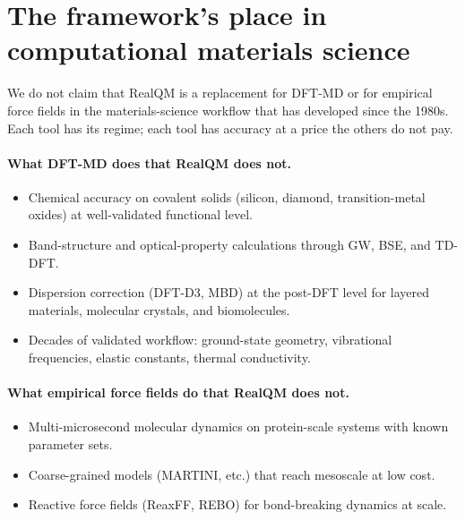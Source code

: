 \section{The framework's place in computational materials science}\label{sec:material-place}

We do not claim that RealQM is a replacement for DFT-MD or for empirical force fields in the materials-science workflow that has developed since the 1980s. Each tool has its regime; each tool has accuracy at a price the others do not pay.

\paragraph{What DFT-MD does that RealQM does not.}
\begin{itemize}
\item Chemical accuracy on covalent solids (silicon, diamond, transition-metal oxides) at well-validated functional level.
\item Band-structure and optical-property calculations through GW, BSE, and TD-DFT.
\item Dispersion correction (DFT-D3, MBD) at the post-DFT level for layered materials, molecular crystals, and biomolecules.
\item Decades of validated workflow: ground-state geometry, vibrational frequencies, elastic constants, thermal conductivity.
\end{itemize}

\paragraph{What empirical force fields do that RealQM does not.}
\begin{itemize}
\item Multi-microsecond molecular dynamics on protein-scale systems with known parameter sets.
\item Coarse-grained models (MARTINI, etc.) that reach mesoscale at low cost.
\item Reactive force fields (ReaxFF, REBO) for bond-breaking dynamics at scale.
\end{itemize}

